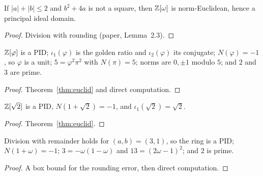 \begin{theorem}\label{thm:euclid}
\leanok
If $|a|+|b|\le2$ and $b^2+4a$ is not a square, then $\mathbb{Z}[\omega]$ is norm-Euclidean, hence
a principal ideal domain.
\end{theorem}
\begin{proof}\leanok
Division with rounding (paper, Lemma~2.3).
\end{proof}

\begin{theorem}\label{thm:zphi}
\leanok
{}
$\mathbb{Z}[\varphi]$ is a PID; $\iota_1(\varphi)$ is the golden ratio and $\iota_2(\varphi)$ its
conjugate; $N(\varphi)=-1$, so $\varphi$ is a unit; $5=\varphi^2\pi^2$ with $N(\pi)=5$; norms
are $0,\pm1$ modulo $5$; and $2$ and $3$ are prime.
\end{theorem}
\begin{proof}\leanok
Theorem~\ref{thm:euclid} and direct computation.
\end{proof}

\begin{theorem}\label{thm:zsqrt2}
\leanok
{}
$\mathbb{Z}[\sqrt2]$ is a PID, $N(1+\sqrt2)=-1$, and $\iota_1(\sqrt2)=\sqrt2$.
\end{theorem}
\begin{proof}\leanok
Theorem~\ref{thm:euclid}.
\end{proof}

\begin{theorem}[$\ZZ\lbrack\omega\rbrack$, $\omega=(1+\sqrt{13})/2$; paper, Prop.~13.1]\label{thm:zsqrt13}
\leanok
Division with remainder holds for $(a,b)=(3,1)$, so the ring is a PID; $N(1+\omega)=-1$;
$3=-\omega(1-\omega)$ and $13=(2\omega-1)^2$; and $2$ is prime.
\end{theorem}
\begin{proof}\leanok
A box bound for the rounding error, then direct computation.
\end{proof}

